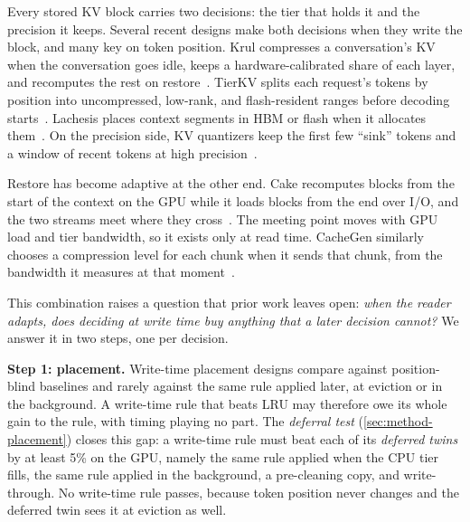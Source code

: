 \documentclass[conference]{IEEEtran}
\begin{document}
Every stored KV block carries two decisions: the tier that holds it and the precision it keeps.
Several recent designs make both decisions when they write the block, and many key on token position.
Krul compresses a conversation's KV when the conversation goes idle, keeps a hardware-calibrated share of each layer, and recomputes the rest on restore~\cite{krul2025}.
TierKV splits each request's tokens by position into uncompressed, low-rank, and flash-resident ranges before decoding starts~\cite{tierkv2026}.
Lachesis places context segments in HBM or flash when it allocates them~\cite{lachesis2026}.
On the precision side, KV quantizers keep the first few ``sink'' tokens and a window of recent tokens at high precision~\cite{kivi2024,kvquant2024,skvq2024,qevict2026}.

Restore has become adaptive at the other end.
Cake recomputes blocks from the start of the context on the GPU while it loads blocks from the end over I/O, and the two streams meet where they cross~\cite{cake2025}.
The meeting point moves with GPU load and tier bandwidth, so it exists only at read time.
CacheGen similarly chooses a compression level for each chunk when it sends that chunk, from the bandwidth it measures at that moment~\cite{cachegen2024}.

This combination raises a question that prior work leaves open: \emph{when the reader adapts, does deciding at write time buy anything that a later decision cannot?}
We answer it in two steps, one per decision.

\textbf{Step 1: placement.}
Write-time placement designs compare against position-blind baselines and rarely against the same rule applied later, at eviction or in the background.
A write-time rule that beats LRU may therefore owe its whole gain to the rule, with timing playing no part.
The \emph{deferral test} (\cref{sec:method-placement}) closes this gap: a write-time rule must beat each of its \emph{deferred twins} by at least 5\% on the GPU, namely the same rule applied when the CPU tier fills, the same rule applied in the background, a pre-cleaning copy, and write-through.
No write-time rule passes, because token position never changes and the deferred twin sees it at eviction as well.
\end{document}
